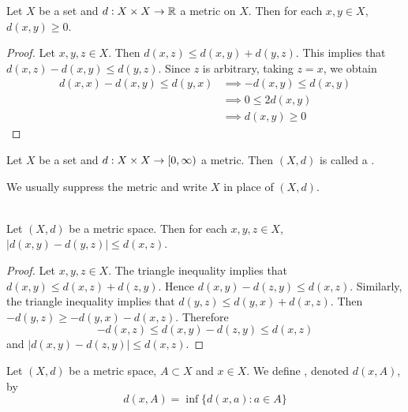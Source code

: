 \documentclass{book}
\begin{document}
\begin{ex} 
	Let $X$ be a set and $d: X \times X \rightarrow \mathbb{R}$ a metric on $X$. Then for each $x,y \in X$, $d(x,y) \geq 0$. 
\end{ex}

\begin{proof}
	Let $x, y, z \in X$. Then $d(x,z) \leq d(x, y) + d(y,z)$. This implies that $d(x,z) - d(x, y) \leq d(y, z)$. Since $z$ is arbitrary, taking $z=x$, we obtain 
	\begin{align*}
		d(x,x) - d(x, y) \leq d(y, x)
		& \implies - d(x, y) \leq d(x, y) \\
		& \implies 0 \leq 2 d(x,y) \\
		& \implies d(x,y) \geq 0
	\end{align*}
\end{proof}	

\begin{defn} 
	Let $X$ be a set and $d: X \times X \rightarrow [0,\infty)$ a metric. Then $(X, d)$ is called a .
\end{defn}	

\begin{note}
	We usually suppress the metric and write $X$ in place of $(X, d)$.
\end{note}	

\begin{ex}   \\
	Let $(X, d)$ be a metric space. Then for each $x,y, z \in X$, $|d(x, y) - d(y,z)| \leq d(x,z)$.
\end{ex}

\begin{proof}
	Let $x,y, z \in X$. The triangle inequality implies that $d(x,y) \leq d(x, z) + d(z,y)$. Hence $d(x,y) - d(z,y) \leq d(x,z)$. Similarly, the triangle inequality implies that $d(y,z) \leq d(y, x) + d(x,z)$. Then $-d(y,z) \geq -d(y, x) - d(x,z)$. Therefore 
	$$- d(x,z) \leq d(x,y) - d(z,y) \leq d(x,z)$$ 
	and $|d(x,y) - d(z,y)| \leq d(x, z)$. 
\end{proof}

\begin{defn} 
	Let $(X, d)$ be a metric space, $A \subset X$ and $x \in X$. We define , denoted $d(x, A)$, by 
	$$d(x, A) = \inf \{d(x, a): a \in A\}$$
\end{defn}
\end{document}
